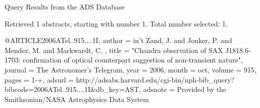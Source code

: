 Query Results from the ADS Database


Retrieved 1 abstracts, starting with number 1.  Total number selected: 1.

@ARTICLE{2006ATel..915....1I,
   author = {{in't Zand}, J. and {Jonker}, P. and {Mendez}, M. and {Markwardt}, C.
	},
    title = "{Chandra observation of SAX J1818.6-1703: confirmation of optical counterpart {\amp} suggestion of non-transient nature}",
  journal = {The Astronomer's Telegram},
     year = 2006,
    month = oct,
   volume = 915,
    pages = {1-+},
   adsurl = {http://adsabs.harvard.edu/cgi-bin/nph-bib_query?bibcode=2006ATel..915....1I&db_key=AST},
  adsnote = {Provided by the Smithsonian/NASA Astrophysics Data System}
}


